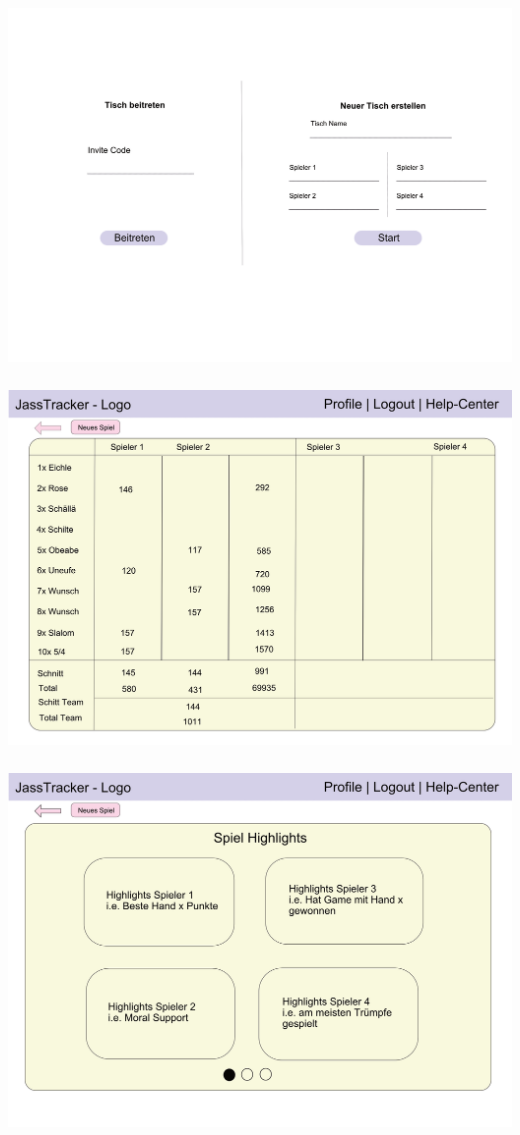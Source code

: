 \includegraphics[height=10cm, width=\textwidth]{resources/mockups/mockup-create-new-table}
\includegraphics[height=10cm, width=\textwidth]{resources/mockups/mockup-scoreboard}
\includegraphics[height=10cm, width=\textwidth]{resources/mockups/mockup-eof-highlights}

